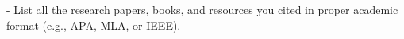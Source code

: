 - List all the research papers, books, and resources you cited in proper academic format (e.g., APA, MLA, or IEEE).  